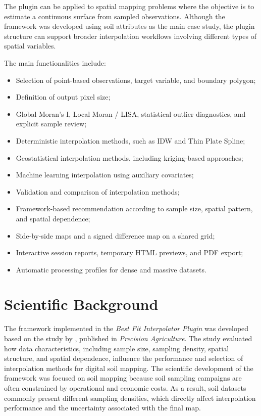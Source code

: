 \documentclass[11pt,a4paper]{article}
\begin{document}
The plugin can be applied to spatial mapping problems where the objective is to estimate a continuous surface from sampled observations. Although the framework was developed using soil attributes as the main case study, the plugin structure can support broader interpolation workflows involving different types of spatial variables.

\vspace{1cm}
The main functionalities include:

\begin{itemize}
    \item Selection of point-based observations, target variable, and boundary polygon;
    \item Definition of output pixel size;
    \item Global Moran's I, Local Moran / LISA, statistical outlier diagnostics, and explicit sample review;
    \item Deterministic interpolation methods, such as IDW and Thin Plate Spline;
    \item Geostatistical interpolation methods, including kriging-based approaches;
    \item Machine learning interpolation using auxiliary covariates;
    \item Validation and comparison of interpolation methods;
    \item Framework-based recommendation according to sample size, spatial pattern, and spatial dependence;
    \item Side-by-side maps and a signed difference map on a shared grid;
    \item Interactive session reports, temporary HTML previews, and PDF export;
    \item Automatic processing profiles for dense and massive datasets.
\end{itemize}

\section{Scientific Background}

The framework implemented in the \textit{Best Fit Interpolator Plugin} was developed based on the study by \citet{delgadobejarano2026}, published in \textit{Precision Agriculture}. The study evaluated how data characteristics, including sample size, sampling density, spatial structure, and spatial dependence, influence the performance and selection of interpolation methods for digital soil mapping. The scientific development of the framework was focused on soil mapping because soil sampling campaigns are often constrained by operational and economic costs. As a result, soil datasets commonly present different sampling densities, which directly affect interpolation performance and the uncertainty associated with the final map.
\end{document}
